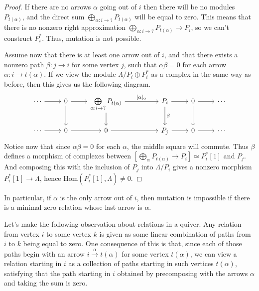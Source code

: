 \documentclass[12pt, dvipsnames, oneside]{amsart}
\theoremstyle{definition}
\newcommand{\Hom}{\text{Hom}}
\begin{document}
\begin{proof}
If there are no arrows $\alpha$ going out of $i$ then there will be no modules $P_{t(\alpha)}$, and the direct sum $\bigoplus\limits_{\alpha:i \rightarrow ?} P_{t(\alpha)}$ will be equal to zero. This means that there is no nonzero right approximation $\bigoplus\limits_{\alpha:i \rightarrow ?} P_{t(\alpha)}\rightarrow P_i$, so we can't construct $P_i^*$. Thus, mutation is not possible.


Assume now that there is at least one arrow out of $i$, and that there exists a nonzero path $\beta\colon j\rightarrow i$ for some vertex $j$, such that $\alpha\beta = 0$ for each arrow $\alpha\colon i\rightarrow t(\alpha)$. If we view the module $\Lambda/P_i \oplus P_i^*$ as a complex in the same way as before, then this gives us the following diagram.
\begin{equation*}
\begin{tikzcd}
\cdots \arrow[r] & 0 \arrow[d] \arrow[r] & \bigoplus\limits_{\alpha:i\rightarrow ?} P_{t(\alpha)} \arrow[rr, "{[\alpha]_{\alpha}}"] \arrow[d] & & P_i \arrow[d, "{\beta}"] \arrow[r] & 0 \arrow[r] \arrow[d] & \cdots \\
\cdots \arrow[r] & 0 \arrow[r] & 0 \arrow[rr] & & P_j \arrow[r] & 0 \arrow[r] & \cdots 
\end{tikzcd}
\end{equation*}
Notice now that since $\alpha\beta = 0$ for each $\alpha$, the middle square will commute. Thus $\beta$ defines a morphism of complexes between $[\bigoplus_\alpha P_{t(\alpha)}\rightarrow P_i]\simeq P_i^*[1]$ and $P_j$. And composing this with the inclusion of $P_j$ into $\Lambda/P_i$ gives a nonzero morphism $P_i^*[1] \rightarrow \Lambda$, hence $\Hom(P_i^*[1], \Lambda)\neq 0$.
\end{proof}

In particular, if $\alpha$ is the only arrow out of $i$, then mutation is impossible if there is a minimal zero relation whose last arrow is $\alpha$. 
\bigskip

Let's make the following observation about relations in a quiver. Any relation from vertex $i$ to some vertex $k$ is given as some linear combination of paths from $i$ to $k$ being equal to zero. One consequence of this is that, since each of those paths begin with an arrow $i \xrightarrow{\alpha} t(\alpha)$ for some vertex $t(\alpha)$, we can view a relation starting in $i$ as a collection of paths starting in such vertices $t(\alpha)$, satisfying that the path starting in $i$ obtained by precomposing with the arrows $\alpha$  and taking the sum is zero. 
\end{document}
